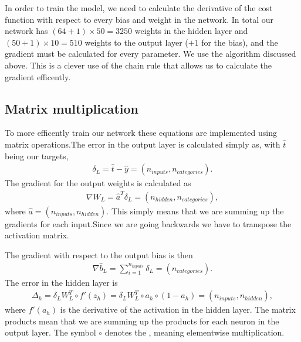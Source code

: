 \documentclass[letterpaper,10pt,english]{sphinxmanual}
\begin{document}
In order to train the model, we need to calculate the derivative of
the cost function with respect to every bias and weight in the
network.  In total our network has \((64 + 1)\times 50=3250\) weights in
the hidden layer and \((50 + 1)\times 10=510\) weights to the output
layer (\(+1\) for the bias), and the gradient must be calculated for
every parameter.  We use the  algorithm discussed
above. This is a clever use of the chain rule that allows us to
calculate the gradient efficently.


\subsection{Matrix  multiplication}
\label{\detokenize{chapter6:matrix-multiplication}}
To more efficently train our network these equations are implemented using matrix operations.The error in the output layer is calculated simply as, with \(\hat{t}\) being our targets,
\begin{equation*}
\begin{split} \delta_L = \hat{t} - \hat{y} = (n_{inputs}, n_{categories}) .\end{split}
\end{equation*}
The gradient for the output weights is calculated as
\begin{equation*}
\begin{split} \nabla W_{L} = \hat{a}^T \delta_L   = (n_{hidden}, n_{categories}) ,\end{split}
\end{equation*}
where \(\hat{a} = (n_{inputs}, n_{hidden})\). This simply means that we are summing up the gradients for each input.Since we are going backwards we have to transpose the activation matrix.

The gradient with respect to the output bias is then
\begin{equation*}
\begin{split} \nabla \hat{b}_{L} = \sum_{i=1}^{n_{inputs}} \delta_L = (n_{categories}) .\end{split}
\end{equation*}
The error in the hidden layer is
\begin{equation*}
\begin{split} \Delta_h = \delta_L W_{L}^T \circ f'(z_{h}) = \delta_L W_{L}^T \circ a_{h} \circ (1 - a_{h}) = (n_{inputs}, n_{hidden}) ,\end{split}
\end{equation*}
where \(f'(a_{h})\) is the derivative of the activation in the hidden layer. The matrix products mean
that we are summing up the products for each neuron in the output layer. The symbol \(\circ\) denotes
the , meaning element\sphinxhyphen{}wise multiplication.
\end{document}
